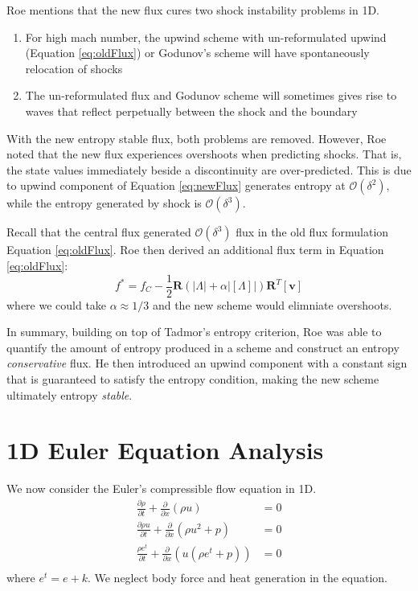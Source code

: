 \documentclass[a4paper]{article}
\numberwithin{equation}{section}
\begin{document}
Roe mentions that the new flux cures two shock instability problems in 1D.
\begin{enumerate}
    \item For high mach number, the upwind scheme with un-reformulated upwind (Equation \ref{eq:oldFlux}) or Godunov's scheme will have spontaneously relocation of shocks
    \item The un-reformulated flux and Godunov scheme will sometimes gives rise to waves that reflect perpetually between the shock and the boundary
\end{enumerate}
With the new entropy stable flux, both problems are removed. However, Roe noted that the new flux experiences overshoots when predicting shocks. That is, the state values immediately beside a discontinuity are over-predicted. This is due to upwind component of Equation \ref{eq:newFlux} generates entropy at $\mathcal{O}(\delta^2)$, while the entropy generated by shock is $\mathcal{O}(\delta^3)$. 

Recall that the central flux generated $\mathcal{O}(\delta^3)$ flux in the old flux formulation Equation \ref{eq:oldFlux}. Roe then derived an additional flux term in Equation \ref{eq:oldFlux}:
\begin{equation}
    f^* = f_C - \frac{1}{2}\mathbf{R}(\left|\Lambda \right| + \alpha \left| \left[\Lambda\right] \right|) \mathbf{R}^T \left[\mathbf{v}\right]
\end{equation}
where we could take $\alpha \approx 1/3$ and the new scheme would elimniate overshoots.

In summary, building on top of Tadmor's entropy criterion, Roe was able to quantify the amount of entropy produced in a scheme and construct an entropy \textit{conservative} flux. He then introduced an upwind component with a constant sign that is guaranteed to satisfy the entropy condition, making the new scheme ultimately entropy \textit{stable}.
\clearpage
\section{1D Euler Equation Analysis}
We now consider the Euler's compressible flow equation in 1D. 
\begin{equation}
    \begin{split}
        \frac{\partial \rho}{\partial t} + \frac{\partial}{\partial x}(\rho u) &= 0\\
        \frac{\partial \rho u}{\partial t} + \frac{\partial}{\partial x}(\rho u^2 + p)& = 0\\
        \frac{\rho e^t}{\partial t} + \frac{\partial}{\partial x}(u(\rho e^t + p))& = 0\\
    \end{split}
\end{equation}
where $e^t = e + k$. We neglect body force and heat generation in the equation.
\end{document}
